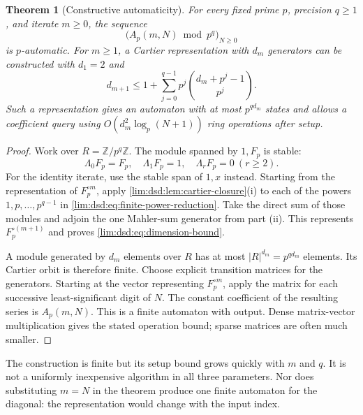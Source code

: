 \documentclass[11pt]{article}
\newtheorem{theorem}{Theorem}[section]
\theoremstyle{definition}
\theoremstyle{remark}
\newcommand{\Z}{\mathbb Z}
\begin{document}
\begin{theorem}[Constructive automaticity]
\label{lim:dsd:thm:automatic}
For every fixed prime $p$, precision $q\ge1$, and iterate $m\ge0$,
the sequence
\begin{equation}
 \bigl(A_p(m,N)\bmod p^q\bigr)_{N\ge0}
 \label{lim:dsd:eq:automatic-sequence}
\end{equation}
is $p$-automatic. For $m\ge1$, a Cartier representation with
$d_m$ generators can be constructed with $d_1=2$ and
\begin{equation}
 d_{m+1}\le1+\sum_{j=0}^{q-1}
 p^j\binom{d_m+p^j-1}{p^j}.
 \label{lim:dsd:eq:dimension-bound}
\end{equation}
Such a representation gives an automaton with at most $p^{qd_m}$
states and allows a coefficient query using
$O(d_m^2\log_p(N+1))$ ring operations after setup.
\end{theorem}
\begin{proof}
Work over $R=\Z/p^q\Z$. The module spanned by $1,F_p$ is stable:
\[
 \Lambda_0F_p=F_p,\quad \Lambda_1F_p=1,\quad
 \Lambda_rF_p=0\ (r\ge2).
\]
For the identity iterate, use the stable span of $1,x$ instead.
Starting from the representation of $F_p^{\circ m}$, apply
\cref{lim:dsd:lem:cartier-closure}(i) to each of the powers
$1,p,\ldots,p^{q-1}$ in \eqref{lim:dsd:eq:finite-power-reduction}.
Take the direct sum of those modules and adjoin the one Mahler-sum
generator from part (ii). This represents $F_p^{\circ(m+1)}$
and proves \eqref{lim:dsd:eq:dimension-bound}.

A module generated by $d_m$ elements over $R$ has at most
$|R|^{d_m}=p^{qd_m}$ elements. Its Cartier orbit is therefore
finite. Choose explicit transition matrices for the generators.
Starting at the vector representing $F_p^{\circ m}$, apply the
matrix for each successive least-significant digit of $N$.
The constant coefficient of the resulting series is $A_p(m,N)$.
This is a finite automaton with output. Dense matrix-vector
multiplication gives the stated operation bound; sparse matrices
are often much smaller.
\end{proof}

The construction is finite but its setup bound grows quickly with
$m$ and $q$. It is not a uniformly inexpensive algorithm in all
three parameters. Nor does substituting $m=N$ in the theorem
produce one finite automaton for the diagonal: the representation
would change with the input index.
\end{document}
